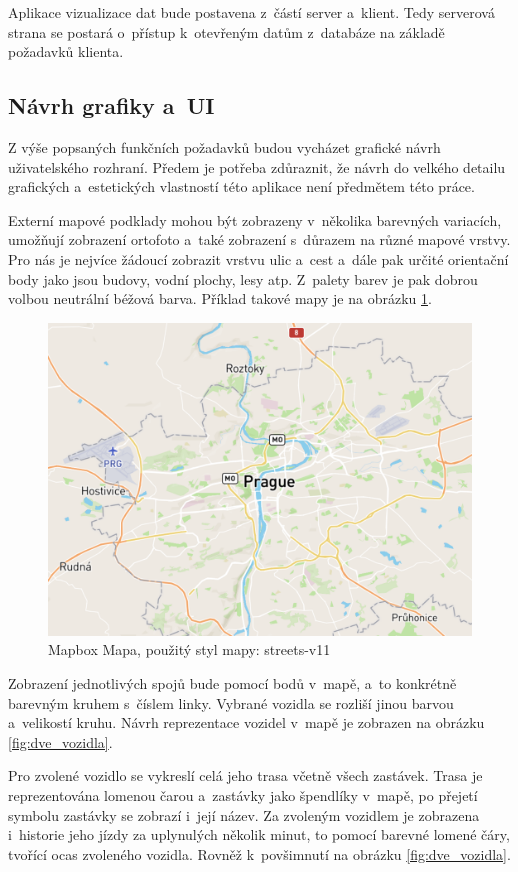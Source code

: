  Aplikace vizualizace dat bude postavena z~částí server a~klient. Tedy serverová strana se postará o~přístup k~otevřeným datům z~databáze na základě požadavků klienta.


\subsection{Návrh grafiky a~UI}


Z výše popsaných funkčních požadavků budou vycházet grafické návrh uživatelského rozhraní. Předem je potřeba zdůraznit, že návrh do velkého detailu grafických a~estetických vlastností této aplikace není předmětem této práce.


\bigbreak


Externí mapové podklady mohou být zobrazeny v~několika barevných variacích, umožňují zobrazení ortofoto a~také zobrazení s~důrazem na různé mapové vrstvy. Pro nás je nejvíce žádoucí zobrazit vrstvu ulic a~cest a~dále pak určité orientační body jako jsou budovy, vodní plochy, lesy atp. Z~palety barev je pak dobrou volbou neutrální béžová barva. Příklad takové mapy je na obrázku \ref{fig:mapbox_mapa}.


\begin{figure}
\centering
  \includegraphics[width=0.5\linewidth]{../img/mapa_mapbox.png}
  \caption{Mapbox Mapa, použitý styl mapy: streets-v11}
  \label{fig:mapbox_mapa}
\end{figure}

\bigbreak


Zobrazení jednotlivých spojů bude pomocí bodů v~mapě, a~to konkrétně barevným kruhem s~číslem linky. Vybrané vozidla se rozliší jinou barvou a~velikostí kruhu. Návrh reprezentace vozidel v~mapě je zobrazen na obrázku \ref{fig:dve_vozidla}.


\bigbreak


Pro zvolené vozidlo se vykreslí celá jeho trasa včetně všech zastávek. Trasa je reprezentována lomenou čarou a~zastávky jako špendlíky v~mapě, po přejetí symbolu zastávky se zobrazí i~její název. Za zvoleným vozidlem je zobrazena i~historie jeho jízdy za uplynulých několik minut, to pomocí barevné lomené čáry, tvořící ocas zvoleného vozidla. Rovněž k~povšimnutí na obrázku \ref{fig:dve_vozidla}.


